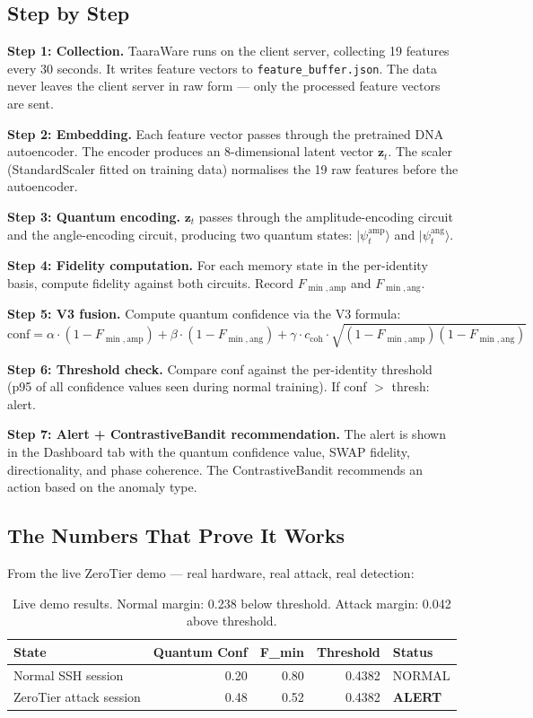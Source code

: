 \documentclass[11pt,a4paper]{article}
\newcommand{\ket}[1]{|#1\rangle}
\begin{document}
\subsection{Step by Step}

\textbf{Step 1: Collection.} TaaraWare runs on the client server, collecting 19 features every 30 seconds. It writes feature vectors to \texttt{feature\_buffer.json}. The data never leaves the client server in raw form — only the processed feature vectors are sent.

\textbf{Step 2: Embedding.} Each feature vector passes through the pretrained DNA autoencoder. The encoder produces an 8-dimensional latent vector $\mathbf{z}_t$. The scaler (StandardScaler fitted on training data) normalises the 19 raw features before the autoencoder.

\textbf{Step 3: Quantum encoding.} $\mathbf{z}_t$ passes through the amplitude-encoding circuit and the angle-encoding circuit, producing two quantum states: $\ket{\psi_t^{\text{amp}}}$ and $\ket{\psi_t^{\text{ang}}}$.

\textbf{Step 4: Fidelity computation.} For each memory state in the per-identity basis, compute fidelity against both circuits. Record $F_{\min,\text{amp}}$ and $F_{\min,\text{ang}}$.

\textbf{Step 5: V3 fusion.} Compute quantum confidence via the V3 formula:
\[
\text{conf} = \alpha \cdot (1 - F_{\min,\text{amp}}) + \beta \cdot (1 - F_{\min,\text{ang}}) + \gamma \cdot c_{\text{coh}} \cdot \sqrt{(1-F_{\min,\text{amp}})(1-F_{\min,\text{ang}})}
\]

\textbf{Step 6: Threshold check.} Compare conf against the per-identity threshold (p95 of all confidence values seen during normal training). If conf $>$ thresh: alert.

\textbf{Step 7: Alert + ContrastiveBandit recommendation.} The alert is shown in the Dashboard tab with the quantum confidence value, SWAP fidelity, directionality, and phase coherence. The ContrastiveBandit recommends an action based on the anomaly type.

\subsection{The Numbers That Prove It Works}

From the live ZeroTier demo — real hardware, real attack, real detection:

\begin{table}[H]
\centering
\begin{tabular}{@{}lrrrl@{}}
\toprule
State & Quantum Conf & F\_min & Threshold & Status \\
\midrule
Normal SSH session & 0.20 & 0.80 & 0.4382 & NORMAL \\
ZeroTier attack session & 0.48 & 0.52 & 0.4382 & \textbf{ALERT} \\
\bottomrule
\end{tabular}
\caption{Live demo results. Normal margin: 0.238 below threshold. Attack margin: 0.042 above threshold.}
\end{table}
\end{document}
